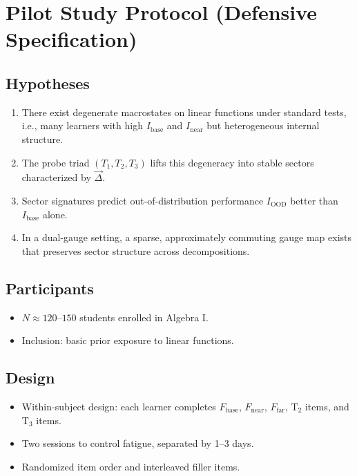 \documentclass[11pt]{article}
\begin{document}
\section{Pilot Study Protocol (Defensive Specification)}

\subsection{Hypotheses}

\begin{enumerate}[itemsep=3pt]
  \item There exist degenerate macrostates on linear functions under standard tests, i.e., many learners with high $I_{\text{base}}$ and $I_{\text{near}}$ but heterogeneous internal structure.
  \item The probe triad $(T_1, T_2, T_3)$ lifts this degeneracy into stable sectors characterized by $\vec{\Delta}$.
  \item Sector signatures predict out-of-distribution performance $I_{\text{OOD}}$ better than $I_{\text{base}}$ alone.
  \item In a dual-gauge setting, a sparse, approximately commuting gauge map exists that preserves sector structure across decompositions.
\end{enumerate}

\subsection{Participants}

\begin{itemize}[itemsep=3pt]
  \item $N \approx 120$--$150$ students enrolled in Algebra I.
  \item Inclusion: basic prior exposure to linear functions.
\end{itemize}

\subsection{Design}

\begin{itemize}[itemsep=3pt]
  \item Within-subject design: each learner completes $F_{\text{base}}$, $F_{\text{near}}$, $F_{\text{far}}$, T$_2$ items, and T$_3$ items.
  \item Two sessions to control fatigue, separated by 1--3 days.
  \item Randomized item order and interleaved filler items.
\end{itemize}
\end{document}

